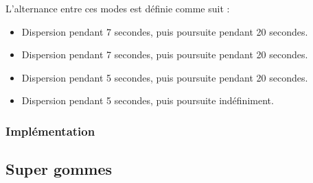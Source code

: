 \documentclass[12pt,a4paper,final]{article}
\begin{document}
L'alternance entre ces modes est définie comme suit :
\begin{itemize}
\item Dispersion pendant 7 secondes, puis poursuite pendant 20 secondes.
\item Dispersion pendant 7 secondes, puis poursuite pendant 20 secondes.
\item Dispersion pendant 5 secondes, puis poursuite pendant 20 secondes.
\item Dispersion pendant 5 secondes, puis poursuite indéfiniment.
\end{itemize}

\subsubsection{Implémentation}






\subsection{Super gommes}
\end{document}
